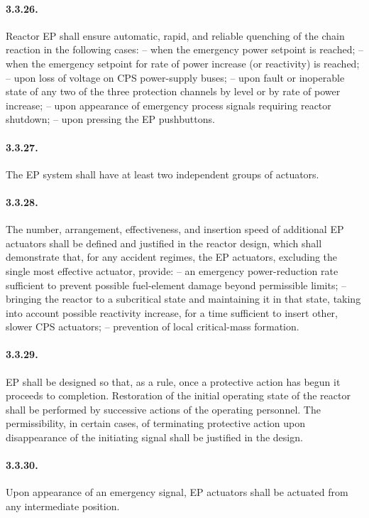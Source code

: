 \documentclass[openright]{bookest}
\begin{document}
\paragraph{3.3.26.} Reactor EP shall ensure automatic, rapid, and reliable quenching of the chain reaction in the following cases:
-- when the emergency power setpoint is reached;
-- when the emergency setpoint for rate of power increase (or reactivity) is reached;
-- upon loss of voltage on CPS power-supply buses;
-- upon fault or inoperable state of any two of the three protection channels by level or by rate of power increase;
-- upon appearance of emergency process signals requiring reactor shutdown;
-- upon pressing the EP pushbuttons.

\paragraph{3.3.27.} The EP system shall have at least two independent groups of actuators.

\paragraph{3.3.28.} The number, arrangement, effectiveness, and insertion speed of additional EP actuators shall be defined and justified in the reactor design, which shall demonstrate that, for any accident regimes, the EP actuators, excluding the single most effective actuator, provide:
-- an emergency power-reduction rate sufficient to prevent possible fuel-element damage beyond permissible limits;
-- bringing the reactor to a subcritical state and maintaining it in that state, taking into account possible reactivity increase, for a time sufficient to insert other, slower CPS actuators;
-- prevention of local critical-mass formation.

\paragraph{3.3.29.} EP shall be designed so that, as a rule, once a protective action has begun it proceeds to completion. Restoration of the initial operating state of the reactor shall be performed by successive actions of the operating personnel. The permissibility, in certain cases, of terminating protective action upon disappearance of the initiating signal shall be justified in the design.

\paragraph{3.3.30.} Upon appearance of an emergency signal, EP actuators shall be actuated from any intermediate position.
\end{document}
